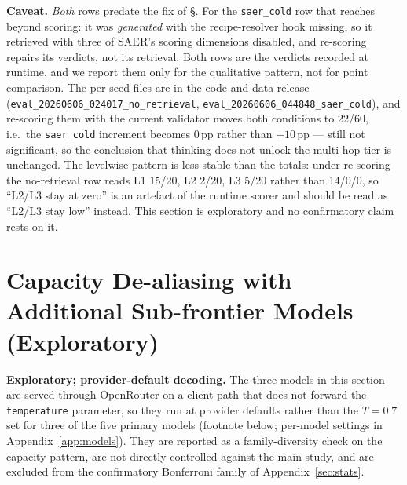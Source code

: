 \documentclass[letterpaper]{article} %
\newcommand{\appref}[1]{Appendix~\ref{#1}}
\newcommand{\bodyref}[1]{\getrefnumber{#1}}
\begin{document}
\noindent\textbf{Caveat.}  \emph{Both} rows predate the fix of
\S\bodyref{sec:protocol}.  For the \texttt{saer\_cold} row that reaches beyond
scoring: it was \emph{generated} with the recipe-resolver hook missing, so it
retrieved with three of SAER's scoring dimensions disabled, and re-scoring
repairs its verdicts, not its retrieval.  Both rows are the verdicts recorded at runtime, and we report them
only for the qualitative pattern, not for point comparison.  The
per-seed files are in the code and data release
(\texttt{eval\_20260606\_024017\_no\_retrieval},
\texttt{eval\_20260606\_044848\_saer\_cold}), and re-scoring them with
the current validator moves both conditions to 22/60, i.e.\ the
\texttt{saer\_cold} increment becomes $0$\,pp rather than $+10$\,pp ---
still not significant, so the conclusion that thinking does not unlock
the multi-hop tier is unchanged.  The
levelwise pattern is less stable than the totals: under re-scoring the
no-retrieval row reads L1 15/20, L2 2/20, L3 5/20 rather than
14/0/0, so ``L2/L3 stay at zero'' is an artefact of the runtime
scorer and should be read as ``L2/L3 stay low'' instead.  This section
is exploratory and no confirmatory claim rests on it.

\section{Capacity De-aliasing with Additional Sub-frontier Models (Exploratory)}
\label{app:capacity}
\label{app:capacity_dealias}

\noindent\textbf{Exploratory; provider-default decoding.}  The three
models in this section are served through OpenRouter on a client path
that does not forward the \texttt{temperature} parameter, so they run
at provider defaults rather than the $T{=}0.7$ set for three of the five
primary models (footnote below; per-model settings in \appref{app:models}).  They are reported as a family-diversity check on the
capacity pattern, are not directly controlled against the main study,
and are excluded from the confirmatory Bonferroni family of \appref{sec:stats}.
\end{document}
